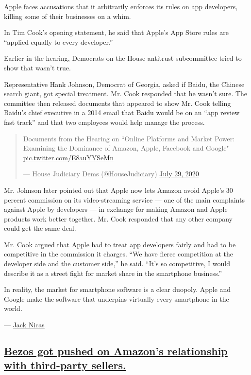 Apple faces accusations that it arbitrarily enforces its rules on app
developers, killing some of their businesses on a whim.

In Tim Cook's opening statement, he said that Apple's App Store rules
are ``applied equally to every developer.''

Earlier in the hearing, Democrats on the House antitrust subcommittee
tried to show that wasn't true.

Representative Hank Johnson, Democrat of Georgia, asked if Baidu, the
Chinese search giant, got special treatment. Mr. Cook responded that he
wasn't sure. The committee then released documents that appeared to show
Mr. Cook telling Baidu's chief executive in a 2014 email that Baidu
would be on an ``app review fast track'' and that two employees would
help manage the process.

\begin{quote}
Documents from the Hearing on ``Online Platforms and Market Power:
Examining the Dominance of Amazon, Apple, Facebook and Google"
\href{https://t.co/E8auYYSeMn}{pic.twitter.com/E8auYYSeMn}

--- House Judiciary Dems (@HouseJudiciary)
\href{https://twitter.com/HouseJudiciary/status/1288543144158597124?ref_src=twsrc\%5Etfw}{July
29, 2020}
\end{quote}

Mr. Johnson later pointed out that Apple now lets Amazon avoid Apple's
30 percent commission on its video-streaming service --- one of the main
complaints against Apple by developers --- in exchange for making Amazon
and Apple products work better together. Mr. Cook responded that any
other company could get the same deal.

Mr. Cook argued that Apple had to treat app developers fairly and had to
be competitive in the commission it charges. ``We have fierce
competition at the developer side and the customer side,'' he said.
``It's so competitive, I would describe it as a street fight for market
share in the smartphone business.''

In reality, the market for smartphone software is a clear duopoly. Apple
and Google make the software that underpins virtually every smartphone
in the world.

--- \href{https://www.nytimes.com/by/jack-nicas}{Jack Nicas}

\hypertarget{bezos-got-pushed-on-amazons-relationship-with-third-party-sellers}{%
\subsection{\texorpdfstring{\protect\hyperlink{bezos-got-pushed-on-amazons-relationship-with-third-party-sellers}{Bezos
got pushed on Amazon's relationship with third-party
sellers.}}{Bezos got pushed on Amazon's relationship with third-party sellers.}}\label{bezos-got-pushed-on-amazons-relationship-with-third-party-sellers}}

